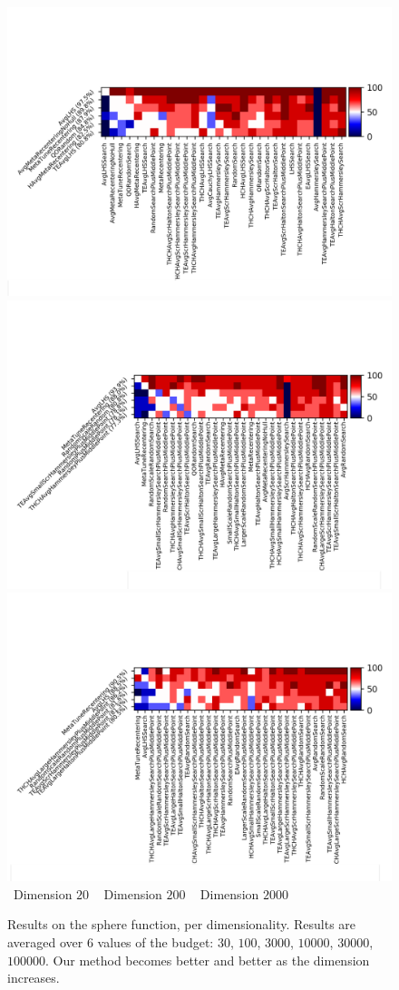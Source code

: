 \begin{figure}[t]
\centering
\includegraphics[trim={10 20 12 80}, clip,width=.32\textwidth]{sections/appendix/ppsn2020-rescaling/figures/fight_namesphere,useful_dimensions20.png}
\includegraphics[trim={10 20 12 80}, clip,width=.32\textwidth]{sections/appendix/ppsn2020-rescaling/figures/fight_namesphere,useful_dimensions200.png}
\includegraphics[trim={10 20 12 80}, clip,width=.32\textwidth]{sections/appendix/ppsn2020-rescaling/figures/fight_namesphere,useful_dimensions2000.png}   \\
~\hfill Dimension $20$ \hfill ~ \hfill Dimension $200$ \hfill ~ \hfill Dimension $2000$\hfill ~\\
\caption{Results on the sphere function, per dimensionality. Results are  averaged over 6 values of the budget: $30$, $100$, $3000$, $10000$, $30000$, $100000$. {Our method becomes better and better as the dimension increases.}}
    \label{toto2}
\end{figure}
